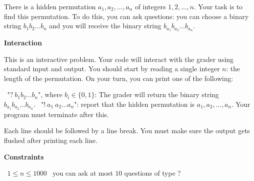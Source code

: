 There is a hidden permutation $a_1, a_2,\dots, a_n$ of integers $1, 2,\dots, n$. Your task is to find this permutation.
To do this, you can ask questions: you can choose a binary string $b_1b_2\dots b_n$ and you will receive the binary string $b_{a_1}b_{a_2}\dots b_{a_n}$.

\vspace{0.3cm}\noindent\textbf{Interaction}

This is an interactive problem. Your code will interact with the grader using standard input and output. You should start by reading a single integer $n$: the length of the permutation.
On your turn, you can print one of the following:

\textbullet\ "$?\ b_1b_2\dots b_n$", where $b_i\in\{0, 1\}$: The grader will return the binary string $b_{a_1}b_{a_2}\dots b_{a_n}$.
\textbullet\ "$!\ a_1\ a_2 \dots a_n$": report that the hidden permutation is $a_1, a_2,\dots, a_n$. Your program must terminate after this.

Each line should be followed by a line break. You must make sure the output gets flushed after printing each line.

\vspace{0.3cm}\noindent\textbf{Constraints}

\textbullet\ $1 \le n \le 1000$
\textbullet\ you can ask at most $10$ questions of type $?$